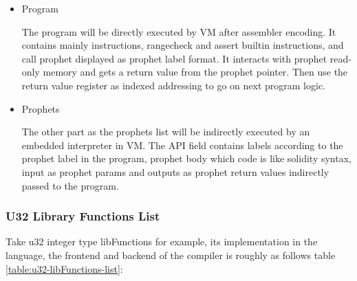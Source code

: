\begin{itemize}
    \item Program

The program will be directly executed by VM after assembler encoding. It contains mainly instructions, rangecheck and assert builtin instructions,
and call prophet displayed as prophet label format. It interacts with prophet read-only memory and gets a return value from the prophet pointer.
Then use the return value register as indexed addressing to go on next program logic.
    \item Prophets

The other part as the prophets list will be indirectly executed by an embedded interpreter in VM.
The API field contains labels according to the prophet label in the program, prophet body which code is like solidity syntax,
input as prophet params and outputs as prophet return values indirectly passed to the program.
\end{itemize}

\subsubsection{U32 Library Functions List}
    Take u32 integer type libFunctions for example, its implementation in the language, the frontend and backend of the compiler is roughly as follows table \ref{table:u32-libFunctions-list}:

